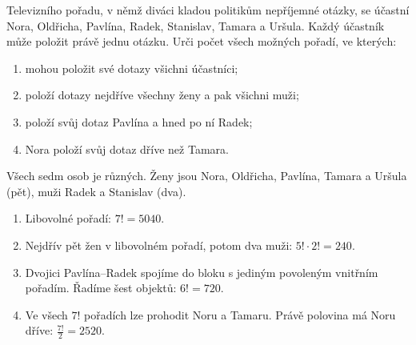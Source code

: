 \documentclass[11pt,a4paper]{article}
\begin{document}

\begin{prikladReseniBox}[title={Příklad 1}]
Televizního pořadu, v němž diváci kladou politikům nepříjemné otázky, se účastní Nora, Oldřicha, Pavlína, Radek, Stanislav, Tamara a Uršula. Každý účastník může položit právě jednu otázku. Urči počet všech možných pořadí, ve kterých:
\begin{enumerate}[label=\alph*),leftmargin=*,itemsep=1pt]
\item mohou položit své dotazy všichni účastníci;
\item položí dotazy nejdříve všechny ženy a pak všichni muži;
\item položí svůj dotaz Pavlína a hned po ní Radek;
\item Nora položí svůj dotaz dříve než Tamara.
\end{enumerate}
\tcblower
Všech sedm osob je různých. Ženy jsou Nora, Oldřicha, Pavlína, Tamara a Uršula (pět), muži Radek a Stanislav (dva).
\begin{enumerate}[label=\alph*),leftmargin=*,itemsep=1pt]
\item Libovolné pořadí: $7!=5040$.
\item Nejdřív pět žen v libovolném pořadí, potom dva muži: $5!\cdot2!=240$.
\item Dvojici Pavlína--Radek spojíme do bloku s jediným povoleným vnitřním pořadím. Řadíme šest objektů: $6!=720$.
\item Ve všech $7!$ pořadích lze prohodit Noru a Tamaru. Právě polovina má Noru dříve: $\frac{7!}{2}=2520$.
\end{enumerate}
\end{prikladReseniBox}
\end{document}
